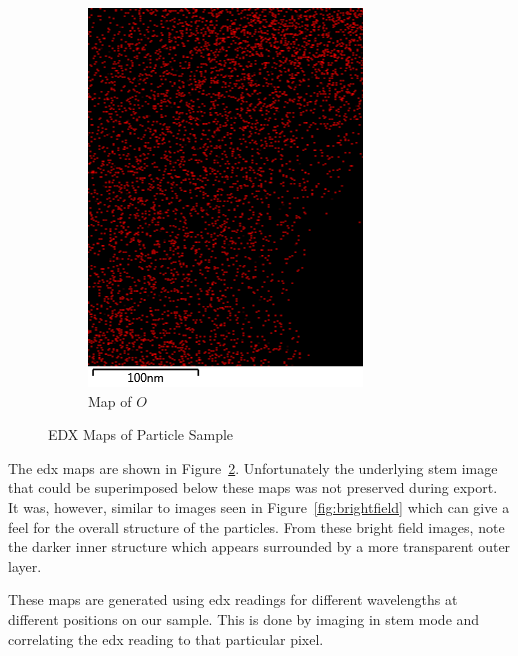 \documentclass[12pt,a4paper]{article}
\begin{document}
\begin{figure}[htbp]
\begin{subfigure}[b]{0.35\textwidth}
    \includegraphics[width=\textwidth]{Data/O Map.png}
    \caption{Map of $O$}
    \label{fig:o_map}
  \end{subfigure}
  \caption{EDX Maps of Particle Sample}\label{fig:map_grid}
\end{figure}

The \ac{edx} maps are shown in Figure~\ref{fig:map_grid}.  Unfortunately the underlying \ac{stem} image that could be superimposed below these maps was not preserved during export.  It was, however, similar to images seen in Figure~\ref{fig:brightfield} which can give a feel for the overall structure of the particles.  From these bright field images, note the darker inner structure which appears surrounded by a more transparent outer layer.

These maps are generated using \ac{edx} readings for different wavelengths at different positions on our sample.  This is done by imaging in \ac{stem} mode and correlating the \ac{edx} reading to that particular pixel.
\end{document}
